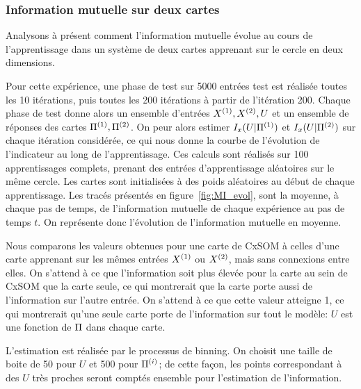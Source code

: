 
\subsubsection{Information mutuelle sur deux cartes}
Analysons à présent comment l'information mutuelle évolue au cours de l'apprentissage dans un système de deux cartes apprenant sur le cercle en deux dimensions.

Pour cette expérience, une phase de test sur 5000 entrées test est réalisée toutes les 10 itérations, puis toutes les 200 itérations à partir de l'itération 200. Chaque phase de test donne alors un ensemble d'entrées $X^{({1})}, X^{({2})}, U$ et un ensemble de réponses des cartes $\Pi^{({1})}, \Pi^{({2})}$. On peur alors estimer $I_x(U|\Pi^{({1})})$ et $I_x(U|\Pi^{({2})})$ sur chaque itération considérée, ce qui nous donne la courbe de l'évolution de l'indicateur au long de l'apprentissage. 
Ces calculs sont réalisés sur 100 apprentissages complets, prenant des entrées d'apprentissage aléatoires sur le même cercle. Les cartes sont initialisées à des poids aléatoires au début de chaque apprentissage. 
Les tracés présentés en figure~\ref{fig:MI_evol}, sont la moyenne, à chaque pas de temps, de l'information mutuelle de chaque expérience au pas de temps $t$. On représente donc l'évolution de l'information mutuelle en moyenne. 

Nous comparons les valeurs obtenues pour une carte de CxSOM à celles d'une carte apprenant sur les mêmes entrées $X^{({1})}$ ou $X^{({2})}$, mais sans connexions entre elles. On s'attend à ce que l'information soit plus élevée pour la carte au sein de CxSOM que la carte seule, ce qui montrerait que la carte porte aussi de l'information sur l'autre entrée. On s'attend à ce que cette valeur atteigne 1, ce qui montrerait qu'une seule carte porte de l'information sur tout le modèle: $U$ est une fonction de $\Pi$ dans chaque carte.

L'estimation est réalisée par le processus de binning. On choisit une taille de boite de 50 pour $U$ et 500 pour $\Pi^{({i})}$; de cette façon, les points correspondant à des $U$ très proches seront comptés ensemble pour l'estimation de l'information.

